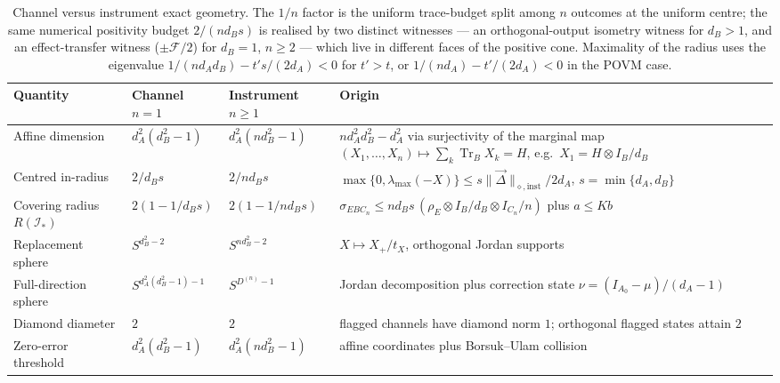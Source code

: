 \documentclass[11pt,a4paper]{article}
\newcommand{\Tr}{\operatorname{Tr}}
\newcommand{\vD}{\vec{\Delta}}
\begin{document}
\begin{table}[t]
\centering
\small
\setlength{\tabcolsep}{4pt}
\begin{tabular}{p{3.4cm}p{3.0cm}p{3.0cm}p{3.4cm}}
\toprule
Quantity & Channel $n=1$ & Instrument $n\ge1$ & Origin \\
\midrule
Affine dimension & $d_A^2(d_B^2-1)$ & $d_A^2(nd_B^2-1)$ & $nd_A^2d_B^2-d_A^2$ via surjectivity of the marginal map $(X_1,\dots,X_n)\mapsto\sum_k\Tr_BX_k=H$, e.g.\ $X_1=H\otimes I_B/d_B$\\
Centred in-radius & $2/d_Bs$ & $2/nd_Bs$ & $\max\{0,\lambda_{\max}(-X)\}\le s\|\vD\|_{\diamond,\mathrm{inst}}/2d_A$, $s=\min\{d_A,d_B\}$\\
Covering radius $R(\mathcal I_*)$ & $2(1-1/d_Bs)$ & $2(1-1/nd_Bs)$ & $\sigma_{EBC_n}\le nd_Bs\,(\rho_E\otimes I_B/d_B\otimes I_{C_n}/n)$ plus $a\le Kb$\\
Replacement sphere & $S^{d_B^2-2}$ & $S^{nd_B^2-2}$ & $X\mapsto X_+/t_X$, orthogonal Jordan supports\\
Full-direction sphere & $S^{d_A^2(d_B^2-1)-1}$ & $S^{D^{(n)}-1}$ & Jordan decomposition plus correction state $\nu=(I_{A_0}-\mu)/(d_A-1)$\\
Diamond diameter & $2$ & $2$ & flagged channels have diamond norm $1$; orthogonal flagged states attain $2$\\
Zero-error threshold & $d_A^2(d_B^2-1)$ & $d_A^2(nd_B^2-1)$ & affine coordinates plus Borsuk--Ulam collision\\
\bottomrule
\end{tabular}
\caption{Channel versus instrument exact geometry. The $1/n$ factor is the uniform trace-budget split among $n$ outcomes at the uniform centre; the same numerical positivity budget $2/(nd_Bs)$ is realised by two distinct witnesses --- an orthogonal-output isometry witness for $d_B>1$, and an effect-transfer witness ($\pm\mathcal F/2$) for $d_B=1$, $n\ge2$ --- which live in different faces of the positive cone. Maximality of the radius uses the eigenvalue $1/(nd_Ad_B)-t's/(2d_A)<0$ for $t'>t$, or $1/(nd_A)-t'/(2d_A)<0$ in the POVM case.}
\label{tab:comparison}
\end{table}
\end{document}
